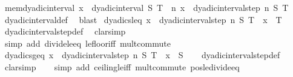 \begin{isabellebody}
%
\isadelimproof
\isanewline
%
\endisadelimproof
\isanewline
{}\isamarkupfalse%
\ mem{\isacharunderscore}{\kern0pt}dyadic{\isacharunderscore}{\kern0pt}interval{\isacharcolon}{\kern0pt}\ {\isachardoublequoteopen}x\ {\isasymin}\ dyadic{\isacharunderscore}{\kern0pt}interval\ S\ T\ {\isasymlongleftrightarrow}\ {\isacharparenleft}{\kern0pt}{\isasymexists}n{\isachardot}{\kern0pt}\ x\ {\isasymin}\ dyadic{\isacharunderscore}{\kern0pt}interval{\isacharunderscore}{\kern0pt}step\ n\ S\ T{\isacharparenright}{\kern0pt}{\isachardoublequoteclose}\isanewline
%
\isadelimproof
\ \ %
\endisadelimproof
%
\isatagproof
{}\isamarkupfalse%
\ dyadic{\isacharunderscore}{\kern0pt}interval{\isacharunderscore}{\kern0pt}def\ \isamarkupfalse%
\ blast%
\endisatagproof
{\isafoldproof}%
%
\isadelimproof
\isanewline
%
\endisadelimproof
\isanewline
{}\isamarkupfalse%
\ dyadics{\isacharunderscore}{\kern0pt}leq{\isacharcolon}{\kern0pt}\ {\isachardoublequoteopen}x\ {\isasymin}\ dyadic{\isacharunderscore}{\kern0pt}interval{\isacharunderscore}{\kern0pt}step\ n\ S\ T\ {\isasymLongrightarrow}\ x\ {\isasymle}\ T{\isachardoublequoteclose}\isanewline
%
\isadelimproof
\ \ %
\endisadelimproof
%
\isatagproof
{}\isamarkupfalse%
\ dyadic{\isacharunderscore}{\kern0pt}interval{\isacharunderscore}{\kern0pt}step{\isacharunderscore}{\kern0pt}def\ \isamarkupfalse%
\ clarsimp\isanewline
\ \ \isamarkupfalse%
\ {\isacharparenleft}{\kern0pt}simp\ add{\isacharcolon}{\kern0pt}\ divide{\isacharunderscore}{\kern0pt}le{\isacharunderscore}{\kern0pt}eq\ le{\isacharunderscore}{\kern0pt}floor{\isacharunderscore}{\kern0pt}iff\ mult{\isachardot}{\kern0pt}commute{\isacharparenright}{\kern0pt}%
\endisatagproof
{\isafoldproof}%
%
\isadelimproof
\isanewline
%
\endisadelimproof
\isanewline
{}\isamarkupfalse%
\ dyadics{\isacharunderscore}{\kern0pt}geq{\isacharcolon}{\kern0pt}\ {\isachardoublequoteopen}x\ {\isasymin}\ dyadic{\isacharunderscore}{\kern0pt}interval{\isacharunderscore}{\kern0pt}step\ n\ S\ T\ {\isasymLongrightarrow}\ x\ {\isasymge}\ S{\isachardoublequoteclose}\isanewline
%
\isadelimproof
\ \ %
\endisadelimproof
%
\isatagproof
{}\isamarkupfalse%
\ dyadic{\isacharunderscore}{\kern0pt}interval{\isacharunderscore}{\kern0pt}step{\isacharunderscore}{\kern0pt}def\ \isamarkupfalse%
\ clarsimp\isanewline
\ \ \isamarkupfalse%
\ {\isacharparenleft}{\kern0pt}simp\ add{\isacharcolon}{\kern0pt}\ ceiling{\isacharunderscore}{\kern0pt}le{\isacharunderscore}{\kern0pt}iff\ mult{\isachardot}{\kern0pt}commute\ pos{\isacharunderscore}{\kern0pt}le{\isacharunderscore}{\kern0pt}divide{\isacharunderscore}{\kern0pt}eq{\isacharparenright}{\kern0pt}%

\end{isabellebody}
